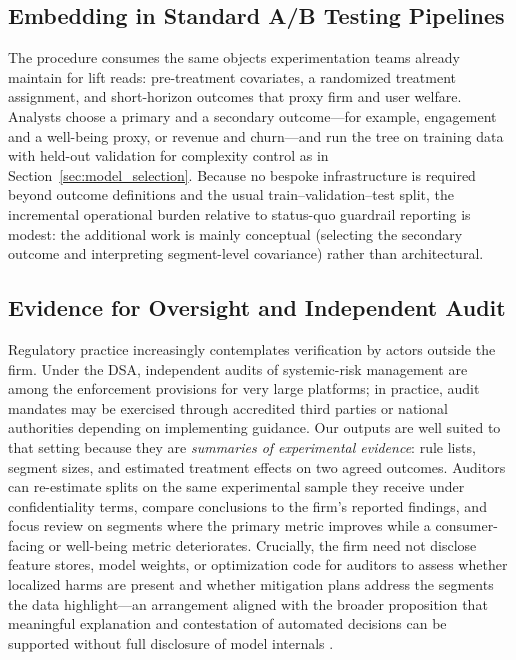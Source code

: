 \documentclass[11pt,letterpaper,english]{article}
\theoremstyle{definition}
\theoremstyle{definition}
\begin{document}
\begin{bibunit}
\subsection{Embedding in Standard A/B Testing Pipelines}

The procedure consumes the same objects experimentation teams already maintain for lift reads: pre-treatment covariates, a randomized treatment assignment, and short-horizon outcomes that proxy firm and user welfare. Analysts choose a primary and a secondary outcome---for example, engagement and a well-being proxy, or revenue and churn---and run the tree on training data with held-out validation for complexity control as in Section~\ref{sec:model_selection}. Because no bespoke infrastructure is required beyond outcome definitions and the usual train--validation--test split, the incremental operational burden relative to status-quo guardrail reporting is modest: the additional work is mainly conceptual (selecting the secondary outcome and interpreting segment-level covariance) rather than architectural.

\subsection{Evidence for Oversight and Independent Audit}

Regulatory practice increasingly contemplates verification by actors outside the firm. Under the DSA, independent audits of systemic-risk management are among the enforcement provisions for very large platforms; in practice, audit mandates may be exercised through accredited third parties or national authorities depending on implementing guidance. Our outputs are well suited to that setting because they are \emph{summaries of experimental evidence}: rule lists, segment sizes, and estimated treatment effects on two agreed outcomes. Auditors can re-estimate splits on the same experimental sample they receive under confidentiality terms, compare conclusions to the firm's reported findings, and focus review on segments where the primary metric improves while a consumer-facing or well-being metric deteriorates. Crucially, the firm need not disclose feature stores, model weights, or optimization code for auditors to assess whether localized harms are present and whether mitigation plans address the segments the data highlight---an arrangement aligned with the broader proposition that meaningful explanation and contestation of automated decisions can be supported without full disclosure of model internals \citep{wachter2017counterfactual}.


\end{bibunit}
\end{document}
